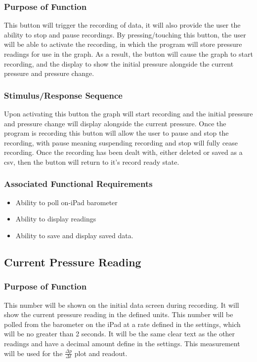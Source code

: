 \documentclass[onecolumn, draftclsnofoot,10pt, compsoc]{IEEEtran}
\begin{document}
\subsubsection{Purpose of Function}
This button will trigger the recording of data, it will also provide the user the ability to stop and pause recordings.
By pressing/touching this button, the user will be able to activate the recording, in which the program will store pressure readings for use in the graph.
As a result, the button will cause the graph to start recording, and the display to show the initial pressure alongside the current pressure and pressure change.
\subsubsection{Stimulus/Response Sequence}
Upon activating this button the graph will start recording and the initial pressure and pressure change will display alongside the current pressure.
Once the program is recording this button will allow the user to pause and stop the recording, with pause meaning suspending recording and stop will fully cease recording.
Once the recording has been dealt with, either deleted or saved as a csv, then the button will return to it's record ready state.
\subsubsection{Associated Functional Requirements}
\begin{itemize}
\item Ability to poll on-iPad barometer
\item Ability to display readings
\item Ability to save and display saved data.
\end{itemize}

\subsection{Current Pressure Reading}
\subsubsection{Purpose of Function}
This number will be shown on the initial data screen during recording.
It will show the current pressure reading in the defined units.
This number will be polled from the barometer on the iPad at a rate defined in the settings, which will be no greater than 2 seconds.
It will be the same clear text as the other readings and have a decimal amount define in the settings.
This measurement will be used for the $\frac{\Delta p}{\Delta t}$ plot and readout.
\end{document}

